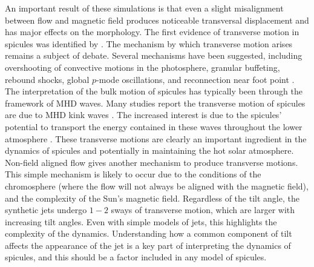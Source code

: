 An important result of these simulations is that even a slight misalignment between flow and magnetic field produces noticeable transversal displacement and has major effects on the morphology. The first evidence of transverse motion in spicules was identified by \cite{Pasachoff1968SoPh5131P}. The mechanism by which transverse motion arises remains a subject of debate. Several mechanisms have been suggested, including overshooting of convective motions in the photosphere, granular buffeting, rebound shocks, global $p$-mode oscillations, and reconnection near foot point \citep{Roberts1979SoPh6123R, Sterling1988ApJ327950S, Vranjes2008A_A478553V, Jess2012ApJ744L5J, Ebadi2014Ap_SS353_31E}. The interpretation of the bulk motion of spicules has typically been through the framework of MHD waves. Many studies report the transverse motion of spicules are due to MHD kink waves \citep{Kukhianidze2006A_A449L35K, dePontieu2007Sci3181574D, Jess2012ApJ744L5J, Ebadi2014ApSS35331E, Tavabi2015AA573A4T, Jafarzadeh2017ApJS2299J}. The increased interest is due to the spicules' potential to transport the energy contained in these waves throughout the lower atmosphere \citep{dePontieu2007Sci3181574D, He2009ApJ705L217H, Morton2012NatCo31315M, Jess2012ApJ744L5J}.  These transverse motions are clearly an important ingredient in the dynamics of spicules and potentially in maintaining the hot solar atmosphere. Non-field aligned flow gives another mechanism to produce transverse motions. This simple mechanism is likely to occur due to the conditions of the chromosphere (where the flow will not always be aligned with the magnetic field), and the complexity of the Sun’s magnetic field. Regardless of the tilt angle, the synthetic jets undergo $1-2$ sways of transverse motion, which are larger with increasing tilt angles. Even with simple models of jets, this highlights the complexity of the dynamics. Understanding how a common component of tilt affects the appearance of the jet is a key part of interpreting the dynamics of spicules, and this should be a factor included in any model of spicules. \np